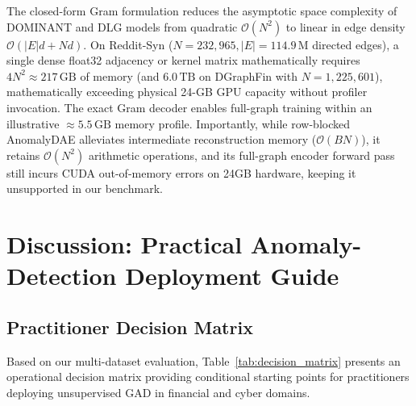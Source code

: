 \documentclass[applsci,article,submit,moreauthors,pdftex]{Definitions/mdpi}
\begin{document}
The closed-form Gram formulation reduces the asymptotic space complexity of DOMINANT and DLG models from quadratic $\mathcal{O}(N^2)$ to linear in edge density $\mathcal{O}(|E| d + N d)$. On Reddit-Syn ($N=232,965, |E|=114.9\,\mathrm{M}$ directed edges), a single dense float32 adjacency or kernel matrix mathematically requires $4 N^2 \approx 217\,\mathrm{GB}$ of memory (and $6.0\,\mathrm{TB}$ on DGraphFin with $N=1,225,601$), mathematically exceeding physical 24-GB GPU capacity without profiler invocation. The exact Gram decoder enables full-graph training within an illustrative $\approx 5.5\,\mathrm{GB}$ memory profile. Importantly, while row-blocked AnomalyDAE alleviates intermediate reconstruction memory ($\mathcal{O}(B N)$), it retains $\mathcal{O}(N^2)$ arithmetic operations, and its full-graph encoder forward pass still incurs CUDA out-of-memory errors on 24GB hardware, keeping it unsupported in our benchmark.

\section{Discussion: Practical Anomaly-Detection Deployment Guide}
\label{sec:discussion}

\subsection{Practitioner Decision Matrix}
Based on our multi-dataset evaluation, Table~\ref{tab:decision_matrix} presents an operational decision matrix providing conditional starting points for practitioners deploying unsupervised GAD in financial and cyber domains.
\end{document}
